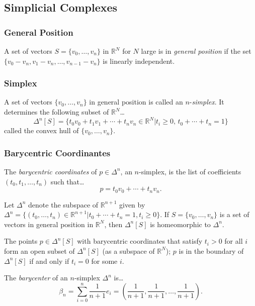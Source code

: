 \subsection{Simplicial Complexes}

\subsubsection{General Position}\label{generalposition}
A set of vectors $S = \{ v_0, \dots, v_n \}$ in $\mathbb{R}^N$ for $N$ large is in \emph{general position}
if the set $\{ v_0 - v_n, v_1 - v_n, \dots, v_{n-1} - v_n \}$ is linearly independent.

\subsubsection{Simplex}\label{simplex}
A set of vectors $\{ v_0, \dots, v_n \}$ in general position is called an $n$-\emph{simplex}. It determines the following subset of $\mathbb{R}^N$\dots
$$\Delta^n[S] = \{t_0 v_0 + t_1 v_1 + \cdots + t_n v_n \in \mathbb{R}^N | t_i \geq 0, \, t_0 + \cdots + t_n = 1 \}$$
called the convex hull of $\{ v_0, \dots, v_n \}$.

\subsubsection{Barycentric Coordinantes}\label{barycentricxy}
The \emph{barycentric coordinates} of $p \in \Delta^n$, an $n$-simplex, is the list of coefficients $(t_0, t_1, \dots, t_n)$
such that\dots
$$p = t_0 v_0 + \cdots + t_n v_n.$$

\begin{proposition}
Let $\Delta^n$ denote the subspace of $\mathbb{R}^{n+1}$ given by $\Delta^n = \{ (t_0, \dots, t_n) \in \mathbb{R}^{n+1} | t_0 + \cdots + t_n = 1, t_i \geq 0 \}.$
If $S = \{ v_0, \dots, v_n \}$ is a set of vectors in general position in $\mathbb{R}^N$, then $\Delta^n[S]$ is homeomorphic to $\Delta^n$.
\end{proposition}

\begin{proposition}
The points $p \in \Delta^n[S]$ with barycentric coordinates that satisfy $t_i > 0$ for all $i$ form an open subset of $\Delta^n[S]$ (as a subspace of $\mathbb{R}^N$);
$p$ is in the boundary of $\Delta^n[S]$ if and only if $t_i = 0$ for some $i$.
\end{proposition}

\label{barycenter}
The \emph{barycenter} of an $n$-simplex $\Delta^n$ is\dots
$$\beta_n = \sum^n_{i=0}\frac{1}{n+1}e_i = \left(\frac{1}{n+1},\frac{1}{n+1},\dots,\frac{1}{n+1}\right).$$

